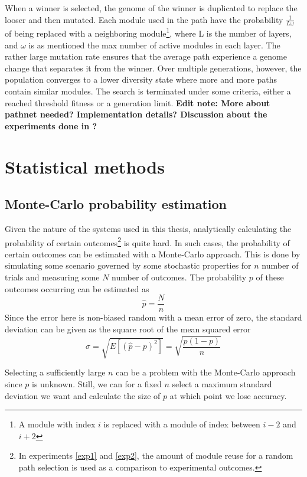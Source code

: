 When a winner is selected, the genome of the winner is duplicated to replace the looser and then mutated. Each module used in the path have the probability \(\frac{1}{L\omega}\) of being replaced with a neighboring module\footnote{A module with index \(i\) is replaced with a module of index between \(i-2\) and \(i+2\)}, where L is the number of layers, and \(\omega\) is as mentioned the max number of active modules in each layer. The rather large mutation rate ensures that the average path experience a genome change that separates it from the winner. Over multiple generations, however, the population converges to a lower diversity state where more and more paths contain similar modules. The search is terminated under some criteria, either a reached threshold fitness or a generation limit. 
\textbf{Edit note: More about pathnet needed? Implementation details? Discussion about the experiments done in \cite{pathnet}?}

\newpage

\section{Statistical methods}
\subsection{Monte-Carlo probability estimation}
\label{mc-estimate}
Given the nature of the systems used in this thesis, analytically calculating the probability of certain outcomes\footnote{In experiments \ref{exp1} and \ref{exp2}, the amount of module reuse for a random path selection is used as a comparison to experimental outcomes.} is quite hard. In such cases, the probability of certain outcomes can be estimated with a Monte-Carlo approach. This is done by simulating some scenario governed by some stochastic properties for \(n\) number of trials and measuring some \(N\) number of outcomes. The probability \(p\) of these outcomes occurring can be estimated as 
\begin{equation*}
    \hat{p}=\frac{N}{n}
\end{equation*}
Since the error here is non-biased random with a mean error of zero, the standard deviation can be given as the square root of the mean squared error 
\begin{equation*}
    \sigma=\sqrt{E[(\hat{p}-p)^{2}]} =\sqrt{\frac{p(1-p)}{n}}
\end{equation*}


Selecting a sufficiently large \(n\) can be a problem with the Monte-Carlo approach since \(p\) is unknown. Still, we can for a fixed \(n\) select a maximum standard deviation we want and calculate the size of \(p\) at which point we lose accuracy. 

